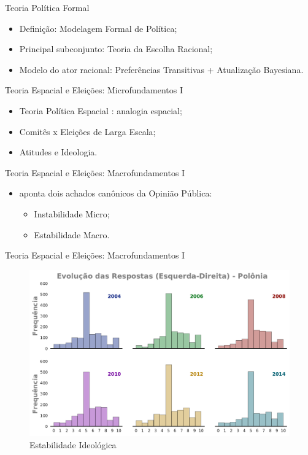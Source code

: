 \documentclass{beamer}
\begin{document}
\begin{frame}{Teoria Política Formal}

  \begin{itemize}
  \item Definição: Modelagem Formal de Política;
  \item Principal subconjunto: Teoria da Escolha Racional;
  \item Modelo do ator racional: Preferências Transitivas + Atualização
    Bayesiana.
  \end{itemize}

\end{frame}


\begin{frame}{Teoria Espacial e Eleições: Microfundamentos I}
  \begin{itemize}
  \item Teoria Política Espacial : analogia espacial;
  \item Comitês x Eleições de Larga Escala;
  \item Atitudes e  Ideologia.
  \end{itemize}
\end{frame}

\begin{frame}{Teoria Espacial e Eleições: Macrofundamentos I }
  \begin{itemize}
\item \textcite{druckman2012public} aponta dois achados canônicos da Opinião
  Pública:
  \begin{itemize}
  \item Instabilidade Micro;
  \item Estabilidade Macro.
  \end{itemize}
  \end{itemize}
  
\end{frame}


\begin{frame}{Teoria Espacial e Eleições: Macrofundamentos I }
  \begin{figure}[H]
    \centering
    \includegraphics[scale = 0.4]{ims/ess_Pol_plots.pdf}
    \caption{Estabilidade Ideológica}
    \label{fig1}
  \end{figure}
\end{frame}
\end{document}
